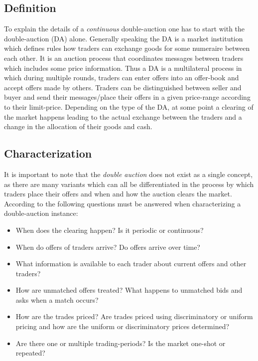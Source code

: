 \documentclass[../Bachelorarbeit.tex]{subfiles}
\begin{document}
\subsection{Definition}
To explain the details of a \textit{continuous} double-auction one has to start with the double-auction (DA) alone. Generally speaking the DA is a \gls{market institution} which defines rules how traders can exchange \glspl{good} for some \gls{numeraire} between each other. It is an \gls{auction} process that coordinates messages between traders which includes some price information. Thus a DA is a multilateral process in which during multiple \glspl{round}, traders can enter \glspl{offer} into an \gls{offer-book} and accept offers made by others. Traders can be distinguished between \gls{seller} and \gls{buyer} and send their messages/place their offers in a given price-range according to their \gls{limit-price}. Depending on the type of the DA, at some point a \gls{clearing} of the market happens leading to the actual exchange between the traders and a change in the allocation of their goods and cash. \cite{Parsons2006}

\subsection{Characterization}
It is important to note that the \textit{double auction} does not exist as a single concept, as there are many variants which can all be differentiated in the process by which traders place their offers and when and how the auction clears the market. According to \cite{Parsons2006} the following questions must be answered when characterizing a double-auction instance:

\begin{itemize}
\item When does the clearing happen? Is it periodic or continuous?
\item When do offers of traders arrive? Do offers arrive over time?
\item What information is available to each trader about current offers and other traders?
\item How are unmatched offers treated? What happens to unmatched bids and asks when a match occurs?
\item How are the trades priced? Are trades priced using discriminatory or uniform pricing and how are the uniform or discriminatory prices determined?
\item Are there one or multiple trading-periods? Is the market one-shot or repeated?
\end{itemize}
\end{document}
